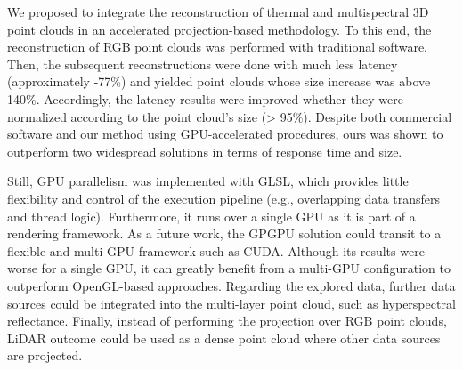 We proposed to integrate the reconstruction of thermal and multispectral 3D point clouds in an accelerated projection-based methodology. To this end, the reconstruction of RGB point clouds was performed with traditional software. Then, the subsequent reconstructions were done with much less latency (approximately -77\%) and yielded point clouds whose size increase was above 140\%. Accordingly, the latency results were improved whether they were normalized according to the point cloud's size (> 95\%). Despite both commercial software and our method using GPU-accelerated procedures, ours was shown to outperform two widespread solutions in terms of response time and size. 

Still, GPU parallelism was implemented with GLSL, which provides little flexibility and control of the execution pipeline (e.g., overlapping data transfers and thread logic). Furthermore, it runs over a single GPU as it is part of a rendering framework. As a future work, the GPGPU solution could transit to a flexible and multi-GPU framework such as CUDA. Although its results were worse for a single GPU, it can greatly benefit from a multi-GPU configuration to outperform OpenGL-based approaches. Regarding the explored data, further data sources could be integrated into the multi-layer point cloud, such as hyperspectral reflectance. Finally, instead of performing the projection over RGB point clouds, LiDAR outcome could be used as a dense point cloud where other data sources are projected.  

